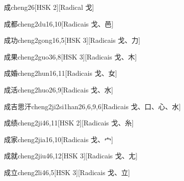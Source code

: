 \begin{entry}{成}{cheng2}{6}[HSK 2][Radical ⼽]
\end{entry}

\begin{entry}{成都}{cheng2du1}{6,10}[Radicais ⼽、⾢]
\end{entry}

\begin{entry}{成功}{cheng2gong1}{6,5}[HSK 3][Radicais ⼽、⼒]
\end{entry}

\begin{entry}{成果}{cheng2guo3}{6,8}[HSK 3][Radicais ⼽、⽊]
\end{entry}

\begin{entry}{成婚}{cheng2hun1}{6,11}[Radicais ⼽、⼥]
\end{entry}

\begin{entry}{成活}{cheng2huo2}{6,9}[Radicais ⼽、⽔]
\end{entry}

\begin{entry}{成吉思汗}{cheng2ji2si1han2}{6,6,9,6}[Radicais ⼽、⼝、⼼、⽔]
\end{entry}

\begin{entry}{成绩}{cheng2ji4}{6,11}[HSK 2][Radicais ⼽、⽷]
\end{entry}

\begin{entry}{成家}{cheng2jia1}{6,10}[Radicais ⼽、⼧]
\end{entry}

\begin{entry}{成就}{cheng2jiu4}{6,12}[HSK 3][Radicais ⼽、⼪]
\end{entry}

\begin{entry}{成立}{cheng2li4}{6,5}[HSK 3][Radicais ⼽、⽴]
\end{entry}

